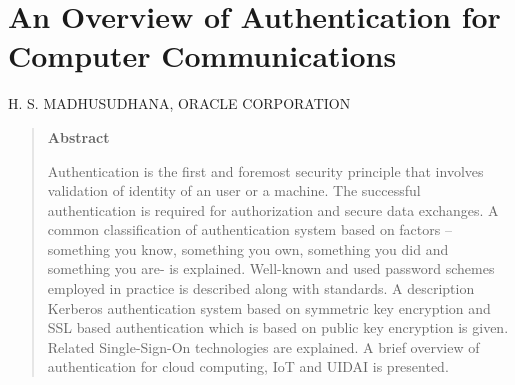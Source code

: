 \chapter{An Overview of Authentication for Computer Communications}

\begin{center}
\uppercase{H. S. Madhusudhana, Oracle Corporation}
\end{center}

\bigskip

\begin{quotation}
\centerline{\bf Abstract}
\medskip

\noindent
Authentication is the first and foremost security principle that involves validation of identity of an user or a machine. The successful authentication is required for authorization and secure data exchanges. A common classification of authentication system based on factors -- something you know, something you own, something you did and something you are- is explained. Well-known and used password schemes employed in practice is described along with standards. A description Kerberos authentication system based on symmetric key encryption and SSL based authentication which is based on public key encryption is given. Related Single-Sign-On technologies are explained. A brief overview of authentication for cloud computing, IoT and UIDAI is presented.
\end{quotation}

\bigskip
\bigskip

